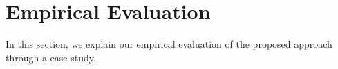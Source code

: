 \chapter{Empirical Evaluation} \label{sec:experiment}
In this section, we explain our empirical evaluation of the proposed approach through a case study.



